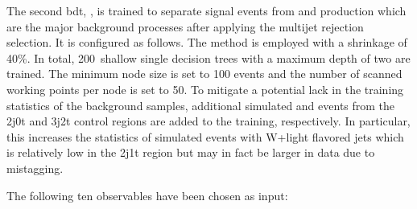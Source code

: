 
The second \gls{bdt}, \bdttch, is trained to separate signal events from \wjets and \ttbar production which are the major background processes after applying the multijet rejection selection. It is configured as follows. The \GRADIENTBOOST method is employed with a shrinkage of 40\%. In total, 200~shallow single decision trees with a maximum depth of two are trained. The minimum node size is set to 100 events and the number of scanned working points per node is set to 50. To mitigate a potential lack in the training statistics of the background samples, additional simulated \wjets and \ttbar events from the 2j0t and 3j2t control regions are added to the training, respectively. In particular, this increases the statistics of simulated events with W+light flavored jets which is relatively low in the 2j1t region but may in fact be larger in data due to mistagging. 

The following ten observables have been chosen as input:

